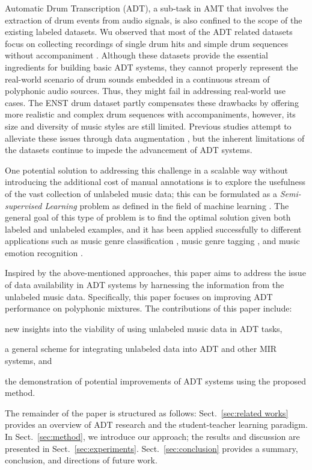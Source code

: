 \documentclass{article}
\begin{document}
Automatic Drum Transcription (ADT), a sub-task in AMT that involves the extraction of drum events from audio signals, is also confined to the scope of the existing labeled datasets. Wu observed \cite{Wu2016} that most of the ADT related datasets focus on collecting recordings of single drum hits \cite{Tindale2004, Prockup2013} and simple drum sequences without accompaniment \cite{Dittmar2014}. Although these datasets provide the essential ingredients for building basic ADT systems, they cannot properly represent the real-world scenario of drum sounds embedded in a continuous stream of polyphonic audio sources. Thus, they might fail in addressing real-world use cases. The ENST drum dataset \cite{Gillet2006} partly compensates these drawbacks by offering more realistic and complex drum sequences with accompaniments, however, its size and diversity of music styles are still limited. Previous studies attempt to alleviate these issues through data augmentation \cite{Wu2016, Vogl2017}, but the inherent limitations of the datasets continue to impede the advancement of ADT systems. 

One potential solution to addressing this challenge in a scalable way without introducing the additional cost of manual annotations is to explore the usefulness of the vast collection of unlabeled music data; this can be formulated as a \textit{Semi-supervised Learning} problem as defined in the field of machine learning \cite{Chapelle2006}. The general goal of this type of problem is to find the optimal solution given both labeled and unlabeled examples, and it has been applied successfully to different applications such as music genre classification \cite{Raina2007a}, music genre tagging \cite{Jao2015}, and music emotion recognition \cite{Wu2013a}.

Inspired by the above-mentioned approaches, this paper aims to address the issue of data availability in ADT systems by harnessing the information from the unlabeled music data. Specifically, this paper focuses on improving ADT performance on polyphonic mixtures. The contributions of this paper include: 
\begin{inparaenum}[(i)]
	\item   new insights into the viability of using unlabeled music data in ADT tasks, 
    \item   a general scheme for integrating unlabeled data into ADT and other MIR systems, and 
    \item   the demonstration of potential improvements of ADT systems using the proposed method.
\end{inparaenum} 
The remainder of the paper is structured as follows: Sect.~\ref{sec:related works} provides an overview of ADT research and the student-teacher learning paradigm. In Sect.~\ref{sec:method}, we introduce our approach; the results and discussion are presented in Sect.~\ref{sec:experiments}. Sect.~\ref{sec:conclusion} provides a summary, conclusion, and directions of future work.
\end{document}
